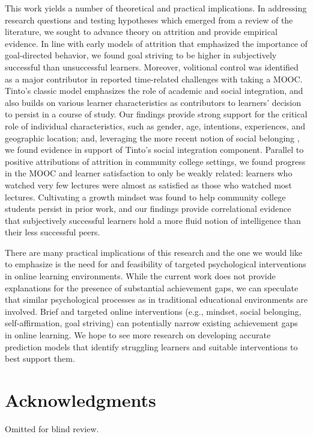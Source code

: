 \documentclass{sigchi}\usepackage[]{graphicx}\usepackage[]{color}
\begin{document}
This work yields a number of theoretical and practical implications. In addressing research questions and testing hypotheses which emerged from a review of the literature, we sought to advance theory on attrition and provide empirical evidence. In line with early models of attrition that emphasized the importance of goal-directed behavior, we found goal striving to be higher in subjectively successful than unsuccessful learners. Moreover, volitional control was identified as a major contributor in reported time-related challenges with taking a MOOC. Tinto's \cite{tinto1975dropout} classic model emphasizes the role of academic and social integration, and also builds on various learner characteristics as contributors to learners' decision to persist in a course of study. Our findings provide strong support for the critical role of individual characteristics, such as gender, age, intentions, experiences, and geographic location; and, leveraging the more recent notion of social belonging \cite{walton2007question}, we found evidence in support of Tinto's social integration component. Parallel to positive attributions of attrition in community college settings, we found progress in the MOOC and learner satisfaction to only be weakly related: learners who watched very few lectures were almost as satisfied as those who watched most lectures. Cultivating a growth mindset was found to help community college students persist in prior work, and our findings provide correlational evidence that subjectively successful learners hold a more fluid notion of intelligence than their less successful peers.

There are many practical implications of this research and the one we would like to emphasize is the need for and feasibility of targeted psychological interventions in online learning environments. While the current work does not provide explanations for the presence of substantial achievement gaps, we can speculate that similar psychological processes as in traditional educational environments are involved. Brief and targeted online interventions (e.g., mindset, social belonging, self-affirmation, goal striving) can potentially narrow existing achievement gaps in online learning. We hope to see more research on developing accurate prediction models that identify struggling learners and suitable interventions to best support them.


\section{Acknowledgments}
Omitted for blind review.
\end{document}
